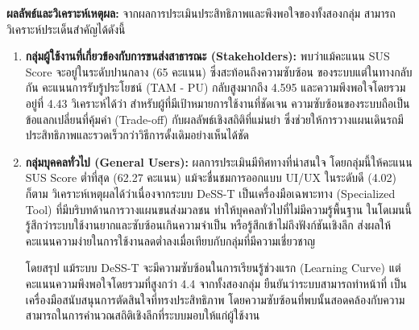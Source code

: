 \textbf{ผลลัพธ์และวิเคราะห์เหตุผล:}
\indent จากผลการประเมินประสิทธิภาพและพึงพอใจของทั้งสองกลุ่ม สามารถวิเคราะห์ประเด็นสำคัญได้ดังนี้
\begin{enumerate}
\item \textbf{กลุ่มผู้ใช้งานที่เกี่ยวข้องกับการขนส่งสาธารณะ (Stakeholders):} 
พบว่าแม้คะแนน SUS Score จะอยู่ในระดับปานกลาง (65 คะแนน) ซึ่งสะท้อนถึงความซับซ้อน
ของระบบแต่ในทางกลับกัน คะแนนการรับรู้ประโยชน์ (TAM - PU) กลับสูงมากถึง 4.595
 และความพึงพอใจโดยรวมอยู่ที่ 4.43 วิเคราะห์ได้ว่า สำหรับผู้ที่มีเป้าหมายการใช้งานที่ชัดเจน 
 ความซับซ้อนของระบบถือเป็นข้อแลกเปลี่ยนที่คุ้มค่า (Trade-off) กับผลลัพธ์เชิงสถิติที่แม่นยำ 
 ซึ่งช่วยให้การวางแผนเดินรถมีประสิทธิภาพและรวดเร็วกว่าวิธีการดั้งเดิมอย่างเห็นได้ชัด

\item \textbf{กลุ่มบุคคลทั่วไป (General Users):} ผลการประเมินมีทิศทางที่น่าสนใจ 
โดยกลุ่มนี้ให้คะแนน SUS Score ต่ำที่สุด (62.27 คะแนน) แม้จะชื่นชมการออกแบบ UI/UX 
ในระดับดี (4.02) ก็ตาม วิเคราะห์เหตุผลได้ว่าเนื่องจากระบบ DeSS-T เป็นเครื่องมือเฉพาะทาง 
(Specialized Tool) ที่มีบริบทด้านการวางแผนขนส่งมวลชน ทำให้บุคคลทั่วไปที่ไม่มีความรู้พื้นฐาน
ในโดเมนนี้รู้สึกว่าระบบใช้งานยากและซับซ้อนเกินความจำเป็น หรือรู้สึกเข้าไม่ถึงฟังก์ชันเชิงลึก 
ส่งผลให้คะแนนความง่ายในการใช้งานลดต่ำลงเมื่อเทียบกับกลุ่มที่มีความเชี่ยวชาญ

\indent โดยสรุป แม้ระบบ DeSS-T จะมีความซับซ้อนในการเรียนรู้ช่วงแรก (Learning Curve)
 แต่คะแนนความพึงพอใจโดยรวมที่สูงกว่า 4.4 จากทั้งสองกลุ่ม ยืนยันว่าระบบสามารถทำหน้าที่
 เป็นเครื่องมือสนับสนุนการตัดสินใจที่ทรงประสิทธิภาพ โดยความซับซ้อนที่พบนั้นสอดคล้องกับความ
 สามารถในการคำนวณสถิติเชิงลึกที่ระบบมอบให้แก่ผู้ใช้งาน
\end{enumerate}

